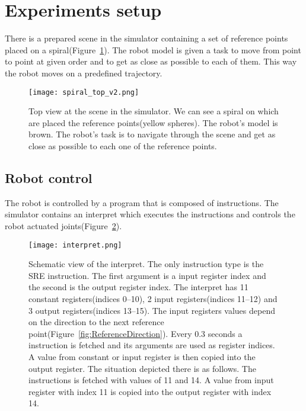 \documentclass{ExcelAtFIT}
\begin{document}

\section{Experiments setup}
\label{sec:ExperimentsSetup}
There is a prepared scene in the simulator containing a set of reference points placed on a spiral(Figure~\ref{fig:SpiralTop}).
The robot model is given a task to move from point to point at given order and to get as close as possible to each of them.
This way the robot moves on a predefined trajectory.

\begin{figure}[t]
\centering
{\texttt{[image: spiral\_top\_v2.png]}}
\caption{Top view at the scene in the simulator.
We can see a spiral on which are placed the reference points(yellow spheres).
The robot's model is brown.
The robot's task is to navigate through the scene and get as close as possible to each one of the reference points.}
\label{fig:SpiralTop}
\end{figure}


\subsection{Robot control}
The robot is controlled by a program that is composed of instructions.
The simulator contains an interpret which executes the instructions and controls the robot actuated joints(Figure~\ref{fig:Interpret}).

\begin{figure}[t]
	\centering
	{\texttt{[image: interpret.png]}}
	\caption{
	Schematic view of the interpret.
	The only instruction type is the SRE instruction.
	The first argument is a input register index and the second is the output register index.
	The interpret has 11 constant registers(indices 0--10), 2 input registers(indices 11--12) and 3 output registers(indices 13--15).
	The input registers values depend on the direction to the next reference point(Figure~\ref{fig:ReferenceDirection}).
	Every 0.3 seconds a instruction is fetched and its arguments are used as register indices.
	A value from constant or input register is then copied into the output register.
	The situation depicted there is as follows.
	The instructions is fetched with values of 11 and 14.
	A value from input register with index 11 is copied into the output register with index 14.
	}
	\label{fig:Interpret}
\end{figure}
\end{document}
